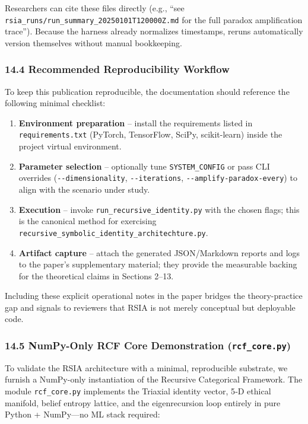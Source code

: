 \documentclass[12pt]{article}
\providecommand{\tightlist}{%
  \setlength{\itemsep}{0pt}\setlength{\parskip}{0pt}}
\begin{document}
Researchers can cite these files directly (e.g., ``see
\texttt{rsia\_runs/run\_summary\_20250101T120000Z.md} for the full
paradox amplification trace''). Because the harness already normalizes
timestamps, reruns automatically version themselves without manual
bookkeeping.

\subsubsection{14.4 Recommended Reproducibility
Workflow}\label{recommended-reproducibility-workflow}

To keep this publication reproducible, the documentation should
reference the following minimal checklist:

\begin{enumerate}
\def\labelenumi{\arabic{enumi}.}
\tightlist
\item
  \textbf{Environment preparation} -- install the requirements listed in
  \texttt{requirements.txt} (PyTorch, TensorFlow, SciPy, scikit-learn)
  inside the project virtual environment.
\item
  \textbf{Parameter selection} -- optionally tune
  \texttt{SYSTEM\_CONFIG} or pass CLI overrides
  (\texttt{-\/-dimensionality}, \texttt{-\/-iterations},
  \texttt{-\/-amplify-paradox-every}) to align with the scenario under
  study.
\item
  \textbf{Execution} -- invoke \texttt{run\_recursive\_identity.py} with
  the chosen flags; this is the canonical method for exercising
  \texttt{recursive\_symbolic\_identity\_architechture.py}.
\item
  \textbf{Artifact capture} -- attach the generated JSON/Markdown
  reports and logs to the paper's supplementary material; they provide
  the measurable backing for the theoretical claims in Sections 2--13.
\end{enumerate}

Including these explicit operational notes in the paper bridges the
theory-practice gap and signals to reviewers that RSIA is not merely
conceptual but deployable code.

\subsubsection{\texorpdfstring{14.5 NumPy-Only RCF Core Demonstration
(\texttt{rcf\_core.py})}{14.5 NumPy-Only RCF Core Demonstration (rcf\_core.py)}}\label{numpy-only-rcf-core-demonstration-rcf_core.py}

To validate the RSIA architecture with a minimal, reproducible
substrate, we furnish a NumPy-only instantiation of the Recursive
Categorical Framework. The module \texttt{rcf\_core.py} implements the
Triaxial identity vector, 5‑D ethical manifold, belief entropy lattice,
and the eigenrecursion loop entirely in pure Python + NumPy---no ML
stack required:
\end{document}
